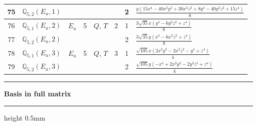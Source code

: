 \documentclass[fleqn,10pt,landscape]{jsarticle}
\begin{document}
\begin{longtable}[l]{clcccccl}
75 & $\mathbb{Q}_{5,2}(E_{u},1)$ &  &  &  &  & 2 & $\frac{y \left(15 x^{4} - 40 x^{2} y^{2} + 30 x^{2} z^{2} + 8 y^{4} - 40 y^{2} z^{2} + 15 z^{4}\right)}{8}$ \\ \hline
76 & $\mathbb{Q}_{5,1}(E_{u},2)$ & $E_{u}$ & 5 & $Q$, $T$ & 2 & 1 & $\frac{3 \sqrt{35} x \left(y^{4} - 6 y^{2} z^{2} + z^{4}\right)}{8}$ \\
77 & $\mathbb{Q}_{5,2}(E_{u},2)$ &  &  &  &  & 2 & $\frac{3 \sqrt{35} y \left(x^{4} - 6 x^{2} z^{2} + z^{4}\right)}{8}$ \\ \hline
78 & $\mathbb{Q}_{5,1}(E_{u},3)$ & $E_{u}$ & 5 & $Q$, $T$ & 3 & 1 & $\frac{\sqrt{105} x \left(2 x^{2} y^{2} - 2 x^{2} z^{2} - y^{4} + z^{4}\right)}{4}$ \\
79 & $\mathbb{Q}_{5,2}(E_{u},3)$ &  &  &  &  & 2 & $\frac{\sqrt{105} y \left(- x^{4} + 2 x^{2} y^{2} - 2 y^{2} z^{2} + z^{4}\right)}{4}$ \\
\end{longtable}
\vspace{5mm}
\noindent \rule[0.5mm]{5mm}{0.5mm}\hspace{3mm}\textbf{Basis in full matrix}\hspace{3mm}\leaders\hrule height 0.5mm\hfill\kern0pt
\vspace{3mm}
\end{document}
